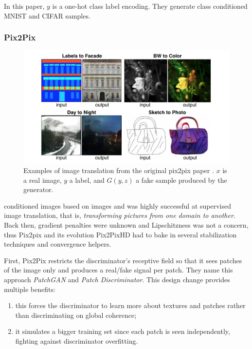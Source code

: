 In this paper, $y$ is a one-hot class label encoding. They generate class conditioned MNIST and CIFAR samples.

\subsubsection{Pix2Pix}
\label{sec:pix2pix}

\begin{figure}
    \centering
    \includegraphics[width=\columnwidth]{60-files/pix2pix.png}
    \caption{Examples of image translation from the original pix2pix paper \cite{pix2pix}. $x$ is a real image, $y$ a label, and $G(y, z)$ a fake sample produced by the generator.}
    \label{fig:pix2pix}
\end{figure}

\citet{pix2pix} conditioned images based on images and was highly successful at supervised image translation, that is, \emph{transforming pictures from one domain to another}. Back then, gradient penalties were unknown and Lipschitzness was not a concern, thus Pix2pix and its evolution Pix2PixHD \citep{pix2pixhd} had to bake in several stabilization techniques and convergence helpers.

First, Pix2Pix restricts the discriminator's receptive field so that it sees patches of the image only and produces a real/fake signal per patch. They name this approach \emph{PatchGAN} and \emph{Patch Discriminator}. This design change provides multiple benefits:

\begin{enumerate}
    \item this forces the discriminator to learn more about textures and patches rather than discriminating on global coherence;
    \item it simulates a bigger training set since each patch is seen independently, fighting against discriminator overfitting.
\end{enumerate}

